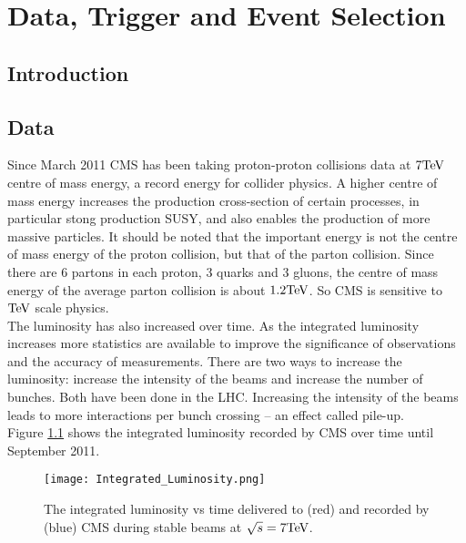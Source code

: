 \chapter{Data, Trigger and Event Selection}

\section{Introduction}

\section{Data}

Since March 2011 CMS has been taking proton-proton collisions data at $7 \mbox{TeV}$ 
centre of mass energy, a record energy for collider physics. A higher centre of 
mass energy increases the production cross-section of certain processes, in 
particular stong production SUSY, and also enables the production of more 
massive particles. It should be noted that the important energy is not the 
centre of mass energy of the proton collision, but that of the parton collision.
Since there are 6 partons in each proton, 3 quarks and 3 gluons, the centre of 
mass energy of the average parton collision is about $1.2 \mbox{TeV}$. So CMS is 
sensitive to $\mbox{TeV}$ scale physics. \\   

The luminosity has also increased over time. As the integrated luminosity 
increases more statistics are available to improve the significance of 
observations and the accuracy of measurements. There are two ways to increase 
the luminosity: increase the intensity of the beams and increase the number of
bunches. Both have been done in the LHC. Increasing the intensity of the beams 
leads to more interactions per bunch crossing -- an effect called pile-up. \\

Figure \ref{fig:intlumi} shows the integrated luminosity recorded by CMS over 
time until September 2011. \\

\begin{figure}
\begin{center}
\texttt{[image: Integrated\_Luminosity.png]}
\caption{The integrated luminosity vs time delivered to (red) and recorded by
(blue) CMS during stable beams at $\sqrt{s} = 7 \mbox{TeV}$.}
\end{center}
\label{fig:intlumi}
\end{figure}

